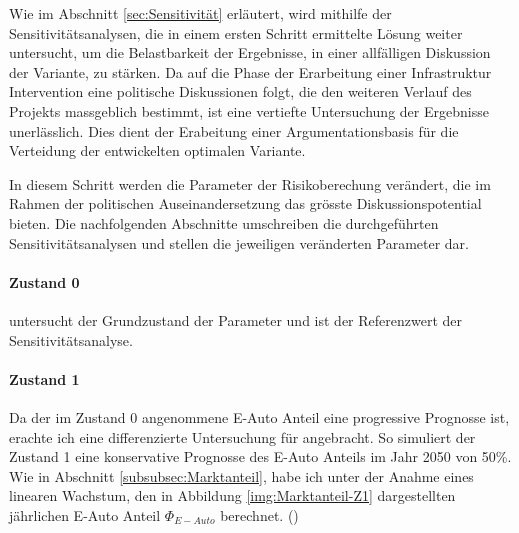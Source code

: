 %
%
%
%

\label{subsec:Sensitivitätsanalyse}

Wie im Abschnitt \ref{sec:Sensitivität} erläutert, wird mithilfe der Sensitivitätsanalysen, die in einem ersten Schritt ermittelte Lösung weiter untersucht, um die Belastbarkeit der Ergebnisse, in einer allfälligen Diskussion der Variante, zu stärken. Da auf die Phase der Erarbeitung einer Infrastruktur Intervention eine politische Diskussionen folgt, die den weiteren Verlauf des Projekts massgeblich bestimmt, ist eine vertiefte Untersuchung der Ergebnisse unerlässlich. Dies dient der Erabeitung einer Argumentationsbasis für die Verteidung der entwickelten optimalen Variante.

In diesem Schritt werden die Parameter der Risikoberechung verändert, die im Rahmen der politischen Auseinandersetzung das grösste Diskussionspotential bieten.
Die nachfolgenden Abschnitte umschreiben die durchgeführten Sensitivitätsanalysen und stellen die jeweiligen veränderten Parameter dar.

\paragraph{Zustand 0} untersucht der Grundzustand der Parameter und ist der Referenzwert der Sensitivitätsanalyse.

\paragraph{Zustand 1} Da der im Zustand 0 angenommene E-Auto Anteil eine progressive Prognosse ist, erachte ich eine differenzierte Untersuchung für angebracht. So simuliert der Zustand 1 eine konservative Prognosse des E-Auto Anteils im Jahr 2050 von 50\%. Wie in Abschnitt \ref{subsubsec:Marktanteil}, habe ich unter der Anahme eines linearen Wachstum, den in Abbildung \ref{img:Marktanteil-Z1} dargestellten jährlichen E-Auto Anteil \( \Phi_{E-Auto} \) berechnet. (\cite{Bestand2019})


